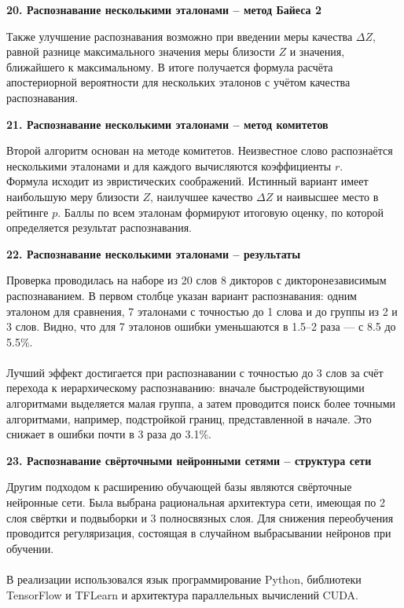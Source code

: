 \documentclass[a4paper, 12pt]{article}
\begin{document}
	
	
	\begin{center}
		\textbf{\large 20. Распознавание несколькими эталонами – метод Байеса 2}
	\end{center}	
	\noindent
	Также улучшение распознавания возможно при введении меры качества $\Delta Z$, равной разнице максимального значения меры близости $Z$ и значения, ближайшего к максимальному. В итоге получается формула расчёта апостериорной вероятности для нескольких эталонов с учётом качества распознавания.
	
	
	
	\begin{center}
		\textbf{\large 21. Распознавание несколькими эталонами – метод комитетов}
	\end{center}	
	\noindent
	Второй алгоритм основан на методе комитетов. Неизвестное слово распознаётся несколькими эталонами и для каждого вычисляются коэффициенты $r$.
	\\
	Формула исходит из эвристических соображений. Истинный вариант имеет наибольшую меру близости $Z$, наилучшее качество $\Delta Z$ и наивысшее место в рейтинге $p$. Баллы по всем эталонам формируют итоговую оценку, по которой определяется результат распознавания.
	
	
	
	\begin{center}
		\textbf{\large 22. Распознавание несколькими эталонами – результаты}
	\end{center}	
	\noindent
	Проверка проводилась на наборе из 20 слов 8 дикторов с дикторонезависимым распознаванием. В первом столбце указан вариант распознавания: одним эталоном для сравнения, 7 эталонами с точностью до 1 слова и до группы из 2 и 3 слов. Видно, что для 7 эталонов ошибки уменьшаются в 1.5–2 раза — с 8.5 до 5.5\%.
	\\\\
	Лучший эффект достигается при распознавании с точностью до 3 слов за счёт перехода к иерархическому распознаванию: вначале быстродействующими алгоритмами выделяется малая группа, а затем проводится поиск более точными алгоритмами, например, подстройкой границ, представленной в начале. Это снижает в ошибки почти в 3 раза до 3.1\%.
	
	
	
	\begin{center}
		\textbf{\large 23. Распознавание свёрточными нейронными сетями – структура сети}
	\end{center}	
	\noindent
	Другим подходом к расширению обучающей базы являются свёрточные нейронные сети. Была выбрана рациональная архитектура сети, имеющая по 2 слоя свёртки и подвыборки и 3 полносвязных слоя. Для снижения переобучения проводится регуляризация, состоящая в случайном выбрасывании нейронов при обучении.
	\\\\
	В реализации использовался язык программирование Python, библиотеки TensorFlow и TFLearn и архитектура параллельных вычислений CUDA.
	
\end{document}
